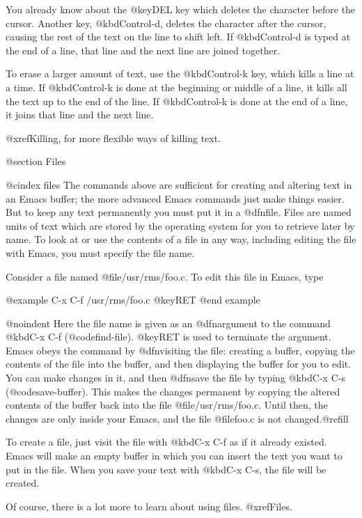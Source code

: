 {{  You already know about the @key{DEL} key which deletes the character
before the cursor.  Another key, @kbd{Control-d}, deletes the character
after the cursor, causing the rest of the text on the line to shift left.
If @kbd{Control-d} is typed at the end of a line, that line and the next
line are joined together.

  To erase a larger amount of text, use the @kbd{Control-k} key, which
kills a line at a time.  If @kbd{Control-k} is done at the beginning or
middle of a line, it kills all the text up to the end of the line.  If
@kbd{Control-k} is done at the end of a line, it joins that line and the
next line.

  @xref{Killing}, for more flexible ways of killing text.

@section Files

@cindex files
  The commands above are sufficient for creating and altering text in an
Emacs buffer; the more advanced Emacs commands just make things easier.
But to keep any text permanently you must put it in a @dfn{file}.  Files
are named units of text which are stored by the operating system for you to
retrieve later by name.  To look at or use the contents of a file in any
way, including editing the file with Emacs, you must specify the file name.

  Consider a file named @file{/usr/rms/foo.c}.  To edit this file in Emacs,
type

@example
C-x C-f /usr/rms/foo.c @key{RET}
@end example

@noindent
Here the file name is given as an @dfn{argument} to the command @kbd{C-x
C-f} (@code{find-file}).  @key{RET} is used to terminate the argument.
Emacs obeys the command by @dfn{visiting} the file: creating a buffer,
copying the contents of the file into the buffer, and then displaying the
buffer for you to edit.  You can make changes in it, and then @dfn{save}
the file by typing @kbd{C-x C-s} (@code{save-buffer}).  This makes the
changes permanent by copying the altered contents of the buffer back into
the file @file{/usr/rms/foo.c}.  Until then, the changes are only inside
your Emacs, and the file @file{foo.c} is not changed.@refill

  To create a file, just visit the file with @kbd{C-x C-f} as if it already
existed.  Emacs will make an empty buffer in which you can insert the text
you want to put in the file.  When you save your text with @kbd{C-x C-s},
the file will be created.

  Of course, there is a lot more to learn about using files.  @xref{Files}.

}}

